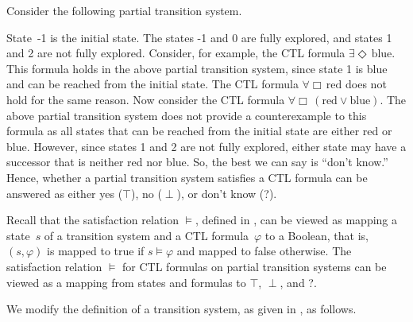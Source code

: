 \documentclass[12pt]{article}
\newcommand{\always}{\Box}
\newcommand{\eventually}{\Diamond}
\theoremstyle{definition}
\begin{document}
Consider the following partial transition system.
\begin{center}
\end{center}
State~-1 is the initial state.  The states -1 and 0 are fully explored, and  states 1 and 2 are not fully explored.  Consider, for example, the CTL formula $\exists \eventually\, \mbox{blue}$.  This formula holds in the above partial transition system, since state 1 is blue and can be reached from the initial state.  The CTL formula $\forall \always\, \mbox{red}$ does not hold for the same reason.  Now consider the CTL formula $\forall \always\, (\mbox{red} \vee \mbox{blue})$.  The above partial transition system does not provide a counterexample to this formula as all states that can be reached from the initial state are either red or blue.  However, since states 1 and 2 are not fully explored, either state may have a successor that is neither red nor blue.  So, the best we can say is ``don't know.''  Hence, whether a partial transition system satisfies a CTL formula can be answered as either yes ($\top$), no ($\perp$), or don't know (?).

Recall that the satisfaction relation $\models$, defined in \cite[Definition~6.4]{BK08}, can be viewed as mapping a state~$s$ of a transition system and a CTL formula~$\varphi$ to a Boolean, that is, $(s, \varphi)$ is mapped to true if $s \models \varphi$ and mapped to false otherwise.  The satisfaction relation $\models$ for CTL formulas on partial transition systems can be viewed as a mapping from states and formulas to $\top$, $\perp$, and ?.

We modify the definition of a transition system, as given in \cite[Definition~2.1]{BK08}, as follows.
\end{document}
